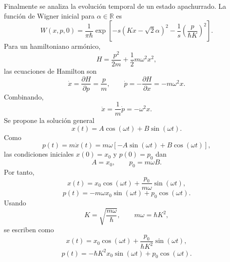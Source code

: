 \documentclass[11pt]{article}
\begin{document}
Finalmente se analiza la evoluci\'on temporal de un estado apachurrado. La
funci\'on de Wigner inicial para $\alpha\in\mathbb R$ es
\begin{equation}
  W(x,p,0)
  =
  \frac{1}{\pi\hbar}
  \exp\left[
  -s(Kx-\sqrt2\alpha)^2
  -\frac{1}{s}\left(\frac{p}{\hbar K}\right)^2
  \right].
\end{equation}
Para un hamiltoniano arm\'onico,
\begin{equation}
  H=\frac{p^2}{2m}+\frac12m\omega^2x^2,
\end{equation}
las ecuaciones de Hamilton son
\begin{equation}
  \dot x=\frac{\partial H}{\partial p}=\frac{p}{m},
  \qquad
  \dot p=-\frac{\partial H}{\partial x}=-m\omega^2x.
\end{equation}
Combinando,
\begin{equation}
  \ddot x=\frac{1}{m}\dot p=-\omega^2x.
\end{equation}
Se propone la soluci\'on general
\begin{equation}
  x(t)=A\cos(\omega t)+B\sin(\omega t).
\end{equation}
Como
\begin{equation}
  p(t)=m\dot x(t)
  =
  m\omega[-A\sin(\omega t)+B\cos(\omega t)],
\end{equation}
las condiciones iniciales $x(0)=x_0$ y $p(0)=p_0$ dan
\begin{equation}
  A=x_0,
  \qquad
  p_0=m\omega B.
\end{equation}
Por tanto,
\begin{equation}
  x(t)=x_0\cos(\omega t)+\frac{p_0}{m\omega}\sin(\omega t),
\end{equation}
\begin{equation}
  p(t)=-m\omega x_0\sin(\omega t)+p_0\cos(\omega t).
\end{equation}
Usando
\begin{equation}
  K=\sqrt{\frac{m\omega}{\hbar}},
  \qquad
  m\omega=\hbar K^2,
\end{equation}
se escriben como
\begin{equation}
  x(t)=x_0\cos(\omega t)+\frac{p_0}{\hbar K^2}\sin(\omega t),
\end{equation}
\begin{equation}
  p(t)=-\hbar K^2x_0\sin(\omega t)+p_0\cos(\omega t).
\end{equation}
\end{document}
